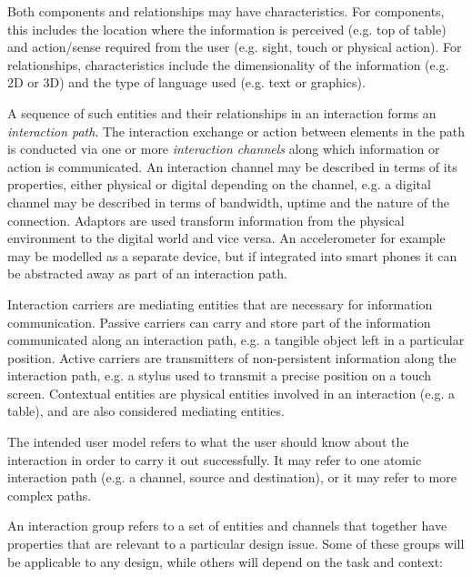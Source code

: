Both components and relationships may have characteristics. For components, this includes the location where the information is perceived (e.g. top of table) and action/sense required from the user (e.g. sight, touch or physical action). For relationships, characteristics include the dimensionality of the information (e.g. 2D or 3D) and the type of language used (e.g. text or graphics).

A sequence of such entities and their relationships in an interaction forms an \emph{interaction path}. The interaction exchange or action between elements in the path is conducted via one or more \emph{interaction channels} along which information or action is communicated. An interaction channel may be described in terms of its properties, either physical or digital depending on the channel, e.g. a digital channel may be described in terms of bandwidth, uptime and the nature of the connection. Adaptors are used transform information from the physical environment to the digital world and vice versa. An accelerometer for example may be modelled as a separate device, but if integrated into smart phones it can be abstracted away as part of an interaction path. 

Interaction carriers are mediating entities that are necessary for information communication. Passive carriers can carry and store part of the information communicated along an interaction path, e.g. a tangible object left in a particular position. Active carriers are transmitters of non-persistent information along the interaction path, e.g. a stylus used to transmit a precise position on a touch screen. Contextual entities are physical entities involved in an interaction (e.g. a table), and are also considered mediating entities.

The intended user model refers to what the user should know about the interaction in order to carry it out successfully. It may refer to one atomic interaction path (e.g. a channel, source and destination), or it may refer to more complex paths. 

An interaction group refers to a set of entities and channels that together have properties that are relevant to a particular design issue. Some of these groups will be applicable to any design, while others will depend on the task and context:

